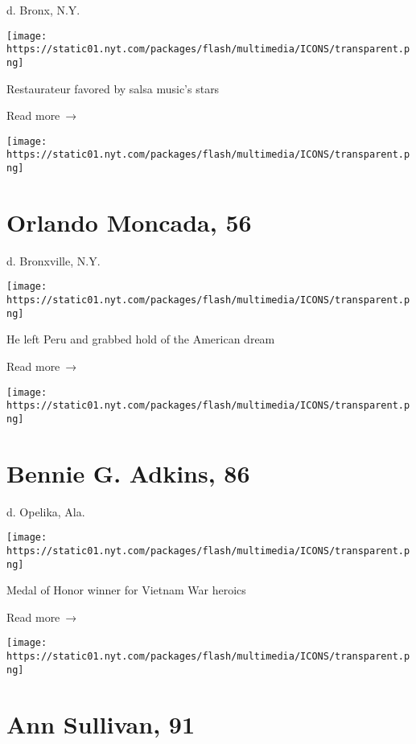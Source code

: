 d. Bronx, N.Y.

\texttt{[image: https://static01.nyt.com/packages/flash/multimedia/ICONS/transparent.png]}

Restaurateur favored by salsa music's stars

 Read more~→

\href{https://www.nytimes.com/2020/04/22/obituaries/orlando-moncada-dead-coronavirus.html}{}

\texttt{[image: https://static01.nyt.com/packages/flash/multimedia/ICONS/transparent.png]}

\hypertarget{orlando-moncada-56}{%
\section{Orlando Moncada, 56}\label{orlando-moncada-56}}

d. Bronxville, N.Y.

\texttt{[image: https://static01.nyt.com/packages/flash/multimedia/ICONS/transparent.png]}

He left Peru and grabbed hold of the American dream

 Read more~→

\href{https://www.nytimes.com/2020/04/22/obituaries/bennie-g-adkins-dead-coronavirus.html}{}

\texttt{[image: https://static01.nyt.com/packages/flash/multimedia/ICONS/transparent.png]}

\hypertarget{bennie-g-adkins-86}{%
\section{Bennie G. Adkins, 86}\label{bennie-g-adkins-86}}

d. Opelika, Ala.

\texttt{[image: https://static01.nyt.com/packages/flash/multimedia/ICONS/transparent.png]}

Medal of Honor winner for Vietnam War heroics

 Read more~→

\href{https://www.nytimes.com/2020/04/21/movies/ann-sullivan-dead-coronavirus.html}{}

\texttt{[image: https://static01.nyt.com/packages/flash/multimedia/ICONS/transparent.png]}

\hypertarget{ann-sullivan-91}{%
\section{Ann Sullivan, 91}\label{ann-sullivan-91}}


